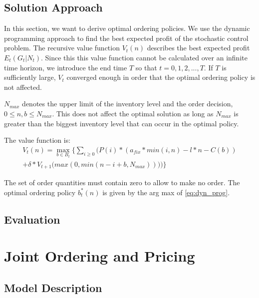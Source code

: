 \subsection{Solution Approach}
In this section, we want to derive optimal ordering policies.
We use the dynamic programming approach to find the best expected profit of the stochastic control problem.
The recursive value function $V_t(n)$ describes the best expected profit $E_t(G_t | N_t)$.
Since this this value function cannot be calculated over an infinite time horizon, we introduce the end time $T$ so that $t = 0, 1, 2, ..., T$.
If $T$ is sufficiently large, $V_t$ converged enough in order that the optimal ordering policy is not affected.

$N_{max}$ denotes the upper limit of the inventory level and the order decision, $0 \leq n, b \leq N_{max}$. This does not affect the optimal solution as long as $N_{max}$ is greater than the biggest inventory level that can occur in the optimal policy.

The value function is:
\begin{equation}
\begin{split}
V_t(n) = \max_{b \in B_t} \Bigg\{
	\sum_{i \geq 0} \Big(
		P(i) * (
			a_{fix} * min(i, n) %
			- l * n %
			- C(b) %
		) \\
		+ \delta * V_{t+1}\big(max(0, min(n - i + b, N_{max}))\big)
	\Big)\Bigg\}
\end{split}
\label{eq:dyn_prog}
\end{equation}

The set of order quantities must contain zero to allow to make no order.
The optimal ordering policy $b_t^*(n)$ is given by the arg max of \cref{eq:dyn_prog}. 


\subsection{Evaluation}

\section{Joint Ordering and Pricing}
\subsection{Model Description}

